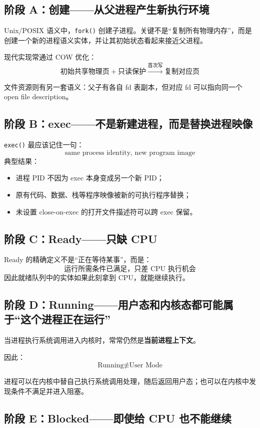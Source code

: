 \documentclass[11pt,a4paper]{ctexart}
\newcommand{\kw}[1]{\textbf{#1}}
\newcommand{\code}[1]{\texttt{#1}}
\begin{document}
\subsection{阶段 A：创建——从父进程产生新执行环境}

Unix/POSIX 语义中，\code{fork()} 创建子进程。关键不是“复制所有物理内存”，而是创建一个新的进程语义实体，并让其初始状态看起来接近父进程。

现代实现常通过 COW 优化：
\[
\text{初始共享物理页}+\text{只读保护}\xrightarrow{\text{首次写}}\text{复制对应页}
\]

文件资源则有另一套语义：父子有各自 fd 表副本，但对应 fd 可以指向同一个 open file description。

\subsection{阶段 B：exec——不是新建进程，而是替换进程映像}

\code{exec()} 最应该记住一句：
\[
\boxed{\text{same process identity, new program image}}
\]
典型结果：
\begin{itemize}
\item 进程 PID 不因为 exec 本身变成另一个新 PID；
\item 原有代码、数据、栈等程序映像被新的可执行程序替换；
\item 未设置 close-on-exec 的打开文件描述符可以跨 exec 保留。
\end{itemize}

\subsection{阶段 C：Ready——只缺 CPU}

Ready 的精确定义不是“正在等待某事”，而是：
\[
\boxed{\text{运行所需条件已满足，只差 CPU 执行机会}}
\]
因此就绪队列中的实体如果此刻拿到 CPU，就能继续执行。

\subsection{阶段 D：Running——用户态和内核态都可能属于“这个进程正在运行”}

当进程执行系统调用进入内核时，常常仍然是\kw{当前进程上下文}。

因此：
\[
\text{Running}\not\equiv\text{User Mode}
\]

进程可以在内核中替自己执行系统调用处理，随后返回用户态；也可以在内核中发现条件不满足并进入阻塞。

\subsection{阶段 E：Blocked——即使给 CPU 也不能继续}
\end{document}
